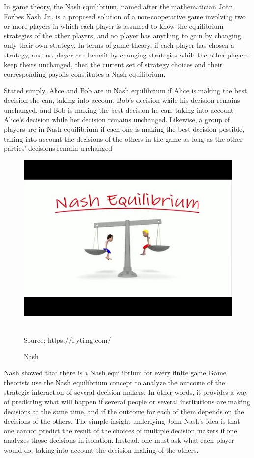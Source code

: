 In game theory, the Nash equilibrium, named after the mathematician John Forbes Nash Jr., is a proposed solution of a non-cooperative game involving two or more players in which each player is assumed to know the equilibrium strategies of the other players, and no player has anything to gain by changing only their own strategy.
In terms of game theory, if each player has chosen a strategy, and no player can benefit by changing strategies while the other players keep theirs unchanged, then the current set of strategy choices and their corresponding payoffs constitutes a Nash equilibrium.

Stated simply, Alice and Bob are in Nash equilibrium if Alice is making the best decision she can, taking into account Bob's decision while his decision remains unchanged, and Bob is making the best decision he can, taking into account Alice's decision while her decision remains unchanged. Likewise, a group of players are in Nash equilibrium if each one is making the best decision possible, taking into account the decisions of the others in the game as long as the other parties' decisions remain unchanged. \\
\begin{figure}
    \centering
    \includegraphics[]{equi.jpg}\\
    \caption{Nash}\\
    Source: https://i.ytimg.com/
    \label{game:3}
\end{figure}

Nash showed that there is a Nash equilibrium for every finite game
Game theorists use the Nash equilibrium concept to analyze the outcome of the strategic interaction of several decision makers. In other words, it provides a way of predicting what will happen if several people or several institutions are making decisions at the same time, and if the outcome for each of them depends on the decisions of the others. The simple insight underlying John Nash's idea is that one cannot predict the result of the choices of multiple decision makers if one analyzes those decisions in isolation. Instead, one must ask what each player would do, taking into account the decision-making of the others.